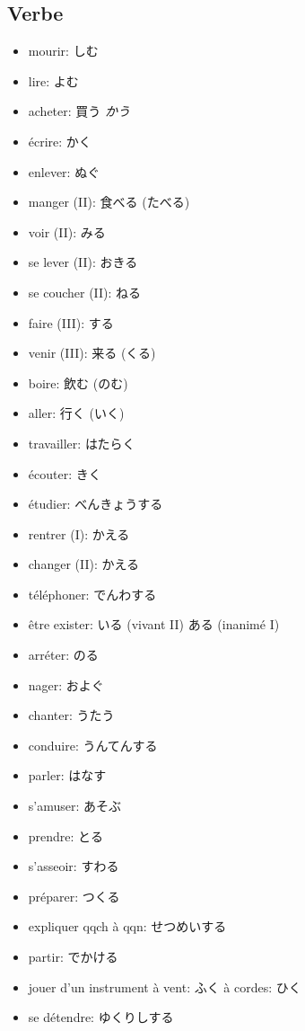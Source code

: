 \documentclass{article}
\begin{document}
\begin{CJK}{UTF8}{min}
    \subsection{Verbe}
    \begin{itemize}
        \item mourir: しむ
        \item lire: よむ
        \item acheter: 買う \textit{かう} 
        \item écrire: かく
        \item enlever: ぬぐ
        \item manger (II): 食べる (たべる)
        \item voir (II): みる
        \item se lever (II): おきる
        \item se coucher (II): ねる
        \item faire (III): する
        \item venir (III): 来る (くる)
        \item boire: 飲む (のむ)
        \item aller: 行く (いく)
        \item travailler: はたらく
        \item écouter: きく
        \item étudier: べんきょうする
        \item rentrer (I):  かえる
        \item changer (II): かえる
        \item téléphoner: でんわする
        \item être exister: いる (vivant II) ある (inanimé I)
        \item arréter: のる
        \item nager: およぐ
        \item chanter: うたう
        \item conduire: うんてんする
        \item parler: はなす
        \item s'amuser: あそぶ
        \item prendre: とる
        \item s'asseoir: すわる
        \item préparer: つくる
        \item expliquer qqch à qqn: せつめいする
        \item partir: でかける
        \item jouer d'un instrument à vent: ふく à cordes: ひく
        \item se détendre: ゆくりしする
    \end{itemize}

\end{CJK}
\end{document}
